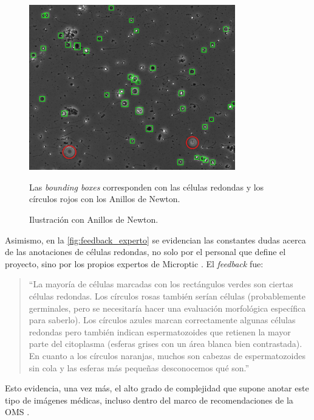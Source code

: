 \documentclass[12pt,a4paper,onecolumn,oneside]{report}
\begin{document}
\begin{figure}[H]
  \centering
  \includegraphics[width=0.8\textwidth]{figuras/rounds_cells/Anillos de Newton.png}
  \caption{Ilustración con Anillos de Newton.}
  \label{fig:Anillos_Newton}
  Las \textit{bounding boxes} corresponden con las células redondas y los círculos rojos con los Anillos de Newton.
\end{figure}

Asimismo, en la \autoref{fig:feedback_experto} se evidencian las constantes dudas acerca de las anotaciones de células redondas, no solo por el personal que define el proyecto, sino por los propios expertos de Microptic \cite{microptic}. 
El \textit{feedback} fue:

\begin{quote}
“La mayoría de células marcadas con los rectángulos verdes son ciertas células redondas. Los círculos rosas también serían células (probablemente germinales, pero se necesitaría hacer una evaluación morfológica específica para saberlo). Los círculos azules marcan correctamente algunas células redondas pero también indican espermatozoides que retienen la mayor parte del citoplasma (esferas grises con un área blanca bien contrastada). En cuanto a los círculos naranjas, muchos son cabezas de espermatozoides sin cola y las esferas más pequeñas desconocemos qué son.”
\end{quote}

Esto evidencia, una vez más, el alto grado de complejidad que supone anotar este tipo de imágenes médicas, incluso dentro del marco de recomendaciones de la OMS \cite{OMS} \cite{BJBS}.
\end{document}
